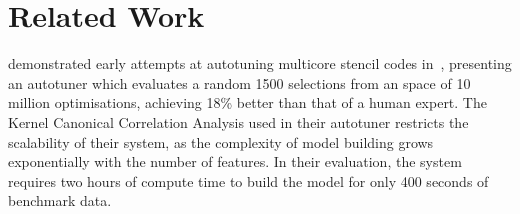 \documentclass[preprint,nonatbib,10pt]{sigplanconf}
\begin{document}
\section{Related Work}\label{sec:related}




\citeauthor{Ganapathi2009} demonstrated early attempts at autotuning
multicore stencil codes in~\cite{Ganapathi2009}, presenting an
autotuner which evaluates a random 1500 selections from an space of 10
million optimisations, achieving 18\% better than that of a human
expert. The Kernel Canonical Correlation Analysis used in their
autotuner restricts the scalability of their system, as the complexity
of model building grows exponentially with the number of features. In
their evaluation, the system requires two hours of compute time to
build the model for only 400 seconds of benchmark data.
\end{document}
